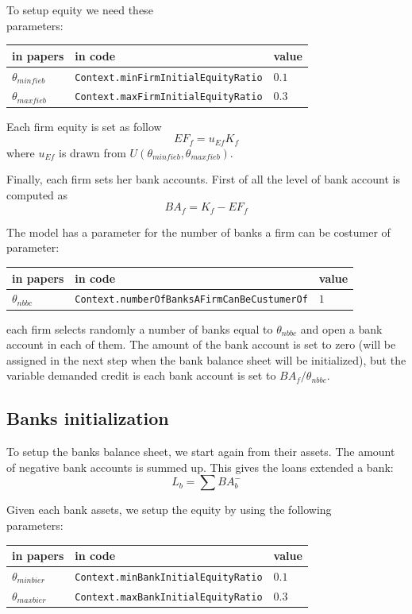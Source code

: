 \documentclass{article}
\begin{document}
To setup equity we need these\\
parameters:\\
\begin{tabular}{l l l}
	\hline
	in papers& in code&value\\
	\hline
	\hline
 $\theta_{minfieb}$&\verb+Context.minFirmInitialEquityRatio+&$0.1$\\
 $\theta_{maxfieb}$&\verb+Context.maxFirmInitialEquityRatio+&$0.3$\\
	\hline
\end{tabular}

\vskip5mm
Each firm equity is set as follow
\[
	EF_f=u_{Ef}K_f
\]
where $u_{Ef}$ is drawn from $U(\theta_{minfieb},\theta_{maxfieb})$.

Finally, each firm sets her bank accounts. First of all the level of bank account is computed as
\[
BA_f=K_f-EF_f
\]

The model has a parameter for the number of banks a firm can be costumer of\\
parameter:\\
\begin{tabular}{l l l}
	\hline
	in papers& in code&value\\
	\hline
	\hline
 $\theta_{nbbc}$&\verb+Context.numberOfBanksAFirmCanBeCustumerOf+&$1$\\
	\hline
\end{tabular}

\vskip5mm
each firm selects randomly a number of banks equal to $\theta_{nbbc}$ and open a bank account in each of them. The amount of the bank account is set to zero (will be assigned in the next step when the bank balance sheet will be initialized), but the variable demanded credit is each bank account is set to $BA_f/\theta_{nbbc}$.


\subsection{Banks initialization}


To setup the banks balance sheet, we start again from their assets.
The amount of negative bank accounts is summed up. This gives the loans extended a bank:
\[
L_b=\sum BA_b^-
\]



Given each bank assets, we setup the equity by using the following\\
parameters:\\
\begin{tabular}{l l l}
	\hline
	in papers& in code&value\\
	\hline
	\hline
 $\theta_{minbier}$&\verb+Context.minBankInitialEquityRatio+&$0.1$\\
 $\theta_{maxbier}$&\verb+Context.maxBankInitialEquityRatio+&$0.3$\\
	\hline
\end{tabular}
\end{document}

